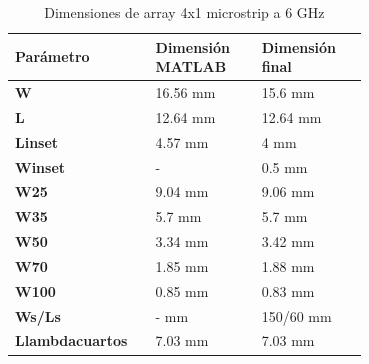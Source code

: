 
\begin{table}[H]
  

   \small %
   \centering %
   \begin{tabular}{m{0.2\linewidth}m{0.25\linewidth}m{0.25\linewidth}} %
   \toprule[\heavyrulewidth]\toprule[\heavyrulewidth]
   \textbf{Parámetro} & \textbf{Dimensión MATLAB} & \textbf{Dimensión final} \\ 
   \midrule
   \textbf{W} & 16.56 mm & 15.6 mm \\
   \textbf{L} & 12.64 mm & 12.64 mm\\
   \textbf{Linset} & 4.57 mm & 4 mm\\
   \textbf{Winset} & - & 0.5 mm\\
   \textbf{W25} & 9.04 mm & 9.06 mm\\
   \textbf{W35} & 5.7 mm & 5.7 mm\\
   \textbf{W50} & 3.34 mm & 3.42 mm\\
   \textbf{W70} & 1.85 mm & 1.88 mm\\
   \textbf{W100} & 0.85 mm & 0.83 mm\\
   \textbf{Ws/Ls} & - mm & 150/60 mm\\
   \textbf{Llambdacuartos} & 7.03 mm & 7.03 mm\\
   \bottomrule[\heavyrulewidth] 
   \end{tabular}
   \caption{Dimensiones de array 4x1 microstrip a 6 GHz} 
      \label{tab:array4x22}
\end{table}




